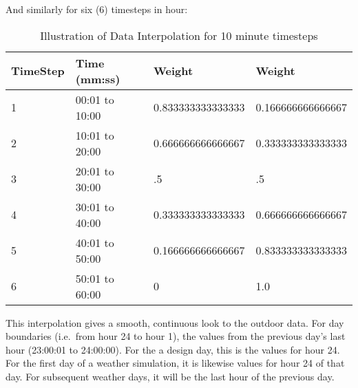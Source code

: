 And similarly for six (6) timesteps in hour:

\begin{longtable}[c]{@{}llll@{}}
\caption{Illustration of Data Interpolation for 10 minute timesteps \protect \label{table:illustration-of-data-interpolation-for-10}}\\
\toprule 
TimeStep & Time (mm:ss) & Weight & Weight \tabularnewline \midrule
\endhead
1 & 00:01 to 10:00 & 0.833333333333333 & 0.166666666666667 \tabularnewline
2 & 10:01 to 20:00 & 0.666666666666667 & 0.333333333333333 \tabularnewline
3 & 20:01 to 30:00 & .5 & .5 \tabularnewline
4 & 30:01 to 40:00 & 0.333333333333333 & 0.666666666666667 \tabularnewline
5 & 40:01 to 50:00 & 0.166666666666667 & 0.833333333333333 \tabularnewline
6 & 50:01 to 60:00 & 0 & 1.0 \tabularnewline
\bottomrule
\end{longtable}

This interpolation gives a smooth, continuous look to the outdoor data. For day boundaries (i.e.~from hour 24 to hour 1), the values from the previous day's last hour (23:00:01 to 24:00:00). For the a design day, this is the values for hour 24. For the first day of a weather simulation, it is likewise values for hour 24 of that day. For subsequent weather days, it will be the last hour of the previous day.
